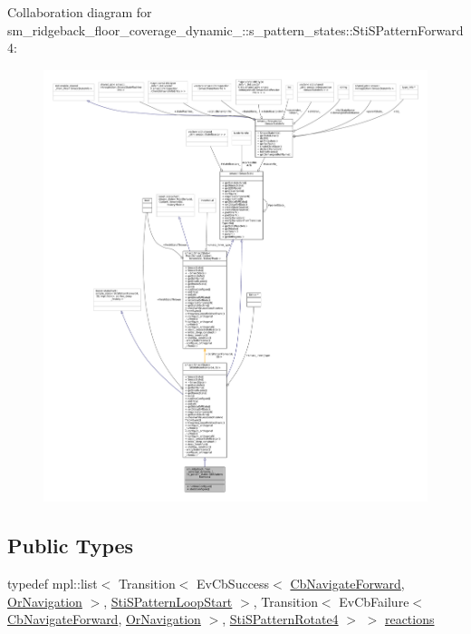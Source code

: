 Collaboration diagram for sm\+\_\+ridgeback\+\_\+floor\+\_\+coverage\+\_\+dynamic\+\_\+:\+:s\+\_\+pattern\+\_\+states\+:\+:Sti\+S\+Pattern\+Forward4\+:
\nopagebreak
\begin{figure}[H]
\begin{center}
\leavevmode
\includegraphics[width=350pt]{structsm__ridgeback__floor__coverage__dynamic__1_1_1s__pattern__states_1_1StiSPatternForward4__coll__graph}
\end{center}
\end{figure}
\subsection*{Public Types}
\begin{DoxyCompactItemize}
\item 
typedef mpl\+::list$<$ Transition$<$ Ev\+Cb\+Success$<$ \hyperlink{classcl__move__base__z_1_1CbNavigateForward}{Cb\+Navigate\+Forward}, \hyperlink{classsm__ridgeback__floor__coverage__dynamic__1_1_1OrNavigation}{Or\+Navigation} $>$, \hyperlink{structsm__ridgeback__floor__coverage__dynamic__1_1_1s__pattern__states_1_1StiSPatternLoopStart}{Sti\+S\+Pattern\+Loop\+Start} $>$, Transition$<$ Ev\+Cb\+Failure$<$ \hyperlink{classcl__move__base__z_1_1CbNavigateForward}{Cb\+Navigate\+Forward}, \hyperlink{classsm__ridgeback__floor__coverage__dynamic__1_1_1OrNavigation}{Or\+Navigation} $>$, \hyperlink{structsm__ridgeback__floor__coverage__dynamic__1_1_1s__pattern__states_1_1StiSPatternRotate4}{Sti\+S\+Pattern\+Rotate4} $>$ $>$ \hyperlink{structsm__ridgeback__floor__coverage__dynamic__1_1_1s__pattern__states_1_1StiSPatternForward4_a307cac210439983eaa109cd272d4262e}{reactions}
\end{DoxyCompactItemize}
